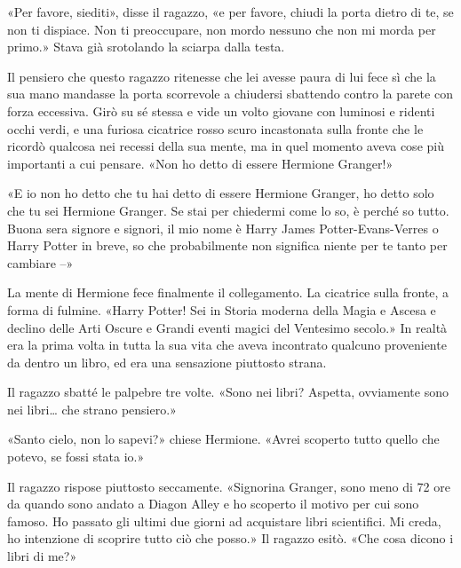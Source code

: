 «Per favore, siediti», disse il ragazzo, «e per favore, chiudi la porta dietro di te, se non ti dispiace. Non ti preoccupare, non mordo nessuno che non mi morda per primo.» Stava già srotolando la sciarpa dalla testa.

Il pensiero che questo ragazzo ritenesse che lei avesse paura di lui fece sì che la sua mano mandasse la porta scorrevole a chiudersi sbattendo contro la parete con forza eccessiva. Girò su sé stessa e vide un volto giovane con luminosi e ridenti occhi verdi, e una furiosa cicatrice rosso scuro incastonata sulla fronte che le ricordò qualcosa nei recessi della sua mente, ma in quel momento aveva cose più importanti a cui pensare. «Non ho detto di essere Hermione Granger!»

«E io non ho detto che tu hai detto di essere Hermione Granger, ho detto solo che tu sei Hermione Granger. Se stai per chiedermi come lo so, è perché so tutto. Buona sera signore e signori, il mio nome è Harry James Potter-Evans-Verres o Harry Potter in breve, so che probabilmente non significa niente per te tanto per cambiare –»

La mente di Hermione fece finalmente il collegamento. La cicatrice sulla fronte, a forma di fulmine. «Harry Potter! Sei in Storia moderna della Magia e Ascesa e declino delle Arti Oscure e Grandi eventi magici del Ventesimo secolo.» In realtà era la prima volta in tutta la sua vita che aveva incontrato qualcuno proveniente da dentro un libro, ed era una sensazione piuttosto strana.

Il ragazzo sbatté le palpebre tre volte. «Sono nei libri? Aspetta, ovviamente sono nei libri… che strano pensiero.»

«Santo cielo, non lo sapevi?» chiese Hermione. «Avrei scoperto tutto quello che potevo, se fossi stata io.»

Il ragazzo rispose piuttosto seccamente. «Signorina Granger, sono meno di 72 ore da quando sono andato a Diagon Alley e ho scoperto il motivo per cui sono famoso. Ho passato gli ultimi due giorni ad acquistare libri scientifici. Mi creda, ho intenzione di scoprire tutto ciò che posso.» Il ragazzo esitò. «Che cosa dicono i libri di me?»

